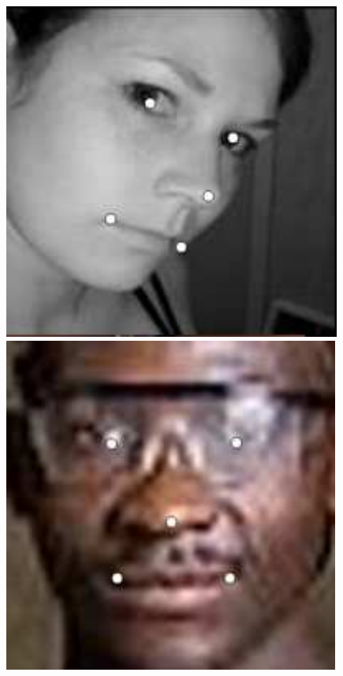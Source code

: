 \documentclass[journal]{IEEEtran}
\begin{document}
\begin{figure}[!htb]
{\begin{minipage}[b]{0.38\textwidth}
\includegraphics[scale=0.22]{5_MCNet_2174}
\includegraphics[scale=0.22]{5_MCNet_755}


\end{minipage}}
\end{figure}
\end{document}
